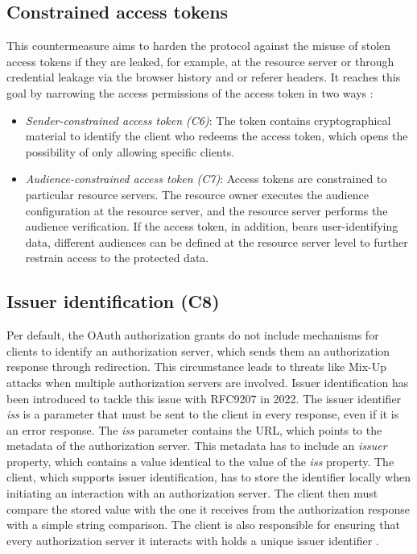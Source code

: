 \subsection{Constrained access tokens}
\label{counter:C6_7}
This countermeasure aims to harden the protocol against the misuse of stolen access tokens if they are leaked, for example, at the resource server or through credential leakage via the browser history and or referer headers. It reaches this goal by narrowing the access permissions of the access token in two ways \cite{lodderstedt2020oauth}:
\begin{itemize}
	\item \emph{Sender-constrained access token (C6)}: The token contains cryptographical material to identify the client who redeems the access token, which opens the possibility of only allowing specific clients.
	\item \emph{Audience-constrained access token (C7)}: Access tokens are constrained to particular resource servers. The resource owner executes the audience configuration at the resource server, and the resource server performs the audience verification. If the access token, in addition, bears user-identifying data, different audiences can be defined at the resource server level to further restrain access to the protected data.
\end{itemize}

 
\subsection[Issuer identification]{Issuer identification (C8)}
\label{counter:C8}
Per default, the OAuth authorization grants do not include mechanisms for clients to identify an authorization server, which sends them an authorization response through redirection. This circumstance leads to threats like Mix-Up attacks when multiple authorization servers are involved. Issuer identification has been introduced to tackle this issue with RFC9207 in 2022. The issuer identifier \emph {iss} is a parameter that must be sent to the client in every response, even if it is an error response. The \emph{iss} parameter contains the URL, which points to the metadata of the authorization server. This metadata has to include an \emph{issuer} property, which contains a value identical to the value of the \emph{iss} property. The client, which supports issuer identification, has to store the identifier locally when initiating an interaction with an authorization server. The client then must compare the stored value with the one it receives from the authorization response with a simple string comparison. The client is also responsible for ensuring that every authorization server it interacts with holds a unique issuer identifier \cite{meyer2022rfc}.


